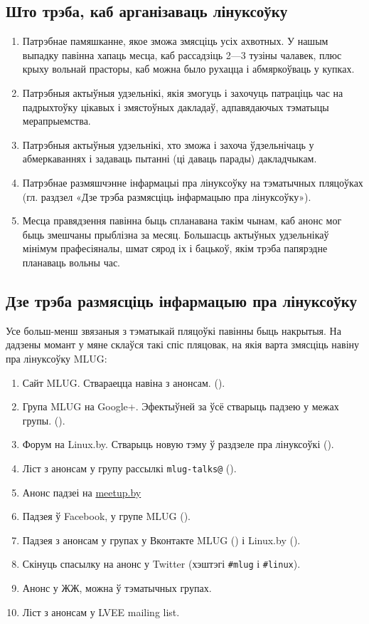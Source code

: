 \documentclass[10pt, a5paper]{article}
\def\v!#1!{\texttt{#1}}
\begin{document}
\subsection*{Што трэба, каб арганізаваць лінуксоўку}

\begin{enumerate}
  \item Патрэбнае памяшканне, якое зможа змясціць усіх ахвотных. У нашым выпадку павінна хапаць месца, каб рассадзіць 2—3 тузіны чалавек, плюс крыху вольнай прасторы, каб можна было рухацца і абмяркоўваць у купках.
  \item Патрэбныя актыўныя удзельнікі, якія змогуць і захочуць патраціць час на падрыхтоўку цікавых і змястоўных дакладаў, адпавядаючых тэматыцы мерапрыемства.
  \item Патрэбныя актыўныя удзельнікі, хто зможа і захоча ўдзельнічаць у абмеркаваннях і задаваць пытанні (ці даваць парады) дакладчыкам.
  \item Патрэбнае размяшчэнне інфармацыі пра лінуксоўку на тэматычных пляцоўках (гл. раздзел «Дзе трэба размясціць інфармацыю пра лінуксоўку»).
  \item Месца правядзення павінна быць спланавана такім чынам, каб анонс мог быць змешчаны прыблізна за месяц. Большасць актыўных удзельнікаў мінімум прафесіяналы, шмат сярод іх і бацькоў, якім трэба папярэдне планаваць вольны час.
\end{enumerate}

\subsection*{Дзе трэба размясціць інфармацыю пра лінуксоўку}

Усе больш-менш звязаныя з тэматыкай пляцоўкі павінны быць накрытыя. На дадзены момант у мяне склаўся такі спіс пляцовак, на якія варта змясціць навіну пра лінуксоўку MLUG:

\begin{enumerate}
  \item Сайт MLUG. Ствараецца навіна з анонсам. (\cite{mlug}).
  \item Група MLUG на Google+. Эфектыўней за ўсё стварыць падзею у межах групы. (\cite{mlug-gplus}).
  \item Форум на Linux.by. Стварыць новую тэму ў раздзеле пра лінуксоўкі (\cite{mlug-forum}).
  \item Ліст з анонсам у групу рассылкі \v!mlug-talks@! (\cite{mlug-talks}).
  \item Анонс падзеі на \url{meetup.by}
  \item Падзея ў Facebook, у групе MLUG (\cite{mlug-fb}).
  \item Падзея з анонсам у групах у Вконтакте MLUG (\cite{mlug-vk-1}) і Linux.by (\cite{mlug-vk-2}).
  \item Скінуць спасылку на анонс у Twitter (хэштэгі \v!\#mlug! і \v!\#linux!).
  \item Анонс у ЖЖ, можна ў тэматычных групах.
  \item Ліст з анонсам у LVEE mailing list.
\end{enumerate}
\end{document}
